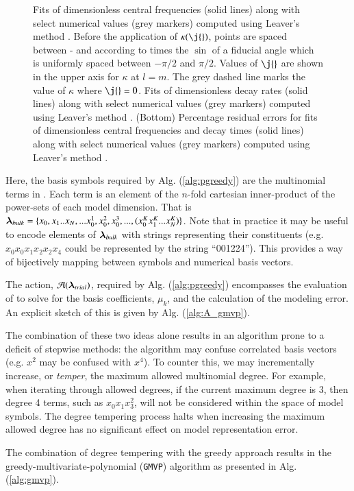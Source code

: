 \documentclass[twocolumn,aps,prd,floatfix,preprintnumbers,a4paper,nofootinbib,
superscriptaddress,10pt]{revtex4-1}
\def\gmvp#1{greedy-multivariate-polynomial#1
  (\texttt{GMVP}#1)\gdef\gmvp{\texttt{GMVP}}}
\def\CwFitCalibrationRegion{\red{0.995} }
\begin{document}
\begin{figure}[htb]
\begin{tabular}{lr}
  \end{tabular}
	\caption{ Fits of dimensionless \qnm{} central frequencies (solid lines) along with select numerical values (grey markers) computed using Leaver's method \cite{Leaver85}.
  Before the application of $\kappa(\j{})$, points are spaced between -\CwFitCalibrationRegion and \CwFitCalibrationRegion according to \CwFitCalibrationRegion times the $\sin$ of a fiducial angle which is uniformly spaced between $-\pi/2$ and $\pi/2$. Values of $\j{}$ are shown in the upper axis for $\kappa$ at $l=m$.
  The grey dashed line marks the value of $\kappa$ where $\j{}=0$. Fits of dimensionless \qnm{} decay rates (solid lines) along with select numerical values (grey markers) computed using Leaver's method \cite{Leaver85}. (Bottom) Percentage residual errors for fits of dimensionless \qnm{} central frequencies and decay times (solid lines) along with select numerical values (grey markers) computed using Leaver's method \cite{Leaver85}. }
  \label{fig:qnm}
\end{figure}
%
\par Here, the basis symbols required by Alg. (\ref{alg:pgreedy}) are the multinomial terms in .
%
Each term is an element of the $n$-fold cartesian inner-product of the power-sets of each model dimension. That is ${\bm{\lambda}}_{bulk} = \{x_0,x_1 .. x_N, ... x_0^1, x_0^2, x_0^3, ...  , (x_0^K x_1^K ... x_N^K) \}$.
%
Note that in practice it may be useful to encode elements of ${\bm{\lambda}}_{bulk}$ with strings representing their constituents (e.g. $x_0 x_0 x_1 x_2 x_2 x_4$ could be represented by the string ``001224''). This provides a way of bijectively mapping between symbols and numerical basis vectors.
%
\par The action, $\mathcal{A}({\bm{\lambda}}_{trial})$, required by Alg. (\ref{alg:pgreedy}) encompasses the evaluation of  to solve for the basis coefficients, $\mu_k$, and the calculation of the modeling error.
%
An explicit sketch of this is given by Alg. (\ref{alg:A_gmvp}).
%
\par The combination of these two ideas alone results in an algorithm prone to a deficit of stepwise methods: the algorithm may confuse correlated basis vectors (e.g. $x^2$ may be confused with $x^4$).
%
To counter this, we may incrementally increase, or \textit{temper}, the maximum allowed multinomial degree.
%
For example, when iterating through allowed degrees, if the current maximum degree is 3, then degree 4 terms, such as $x_0x_1x_3^2$, will not be considered within the space of model symbols.
%
The degree tempering process halts when increasing the maximum allowed degree has no significant effect on model representation error.
%
\par The combination of degree tempering with the greedy approach results in the \gmvp{} algorithm as presented in Alg. (\ref{alg:gmvp}).
%
%
\end{document}
